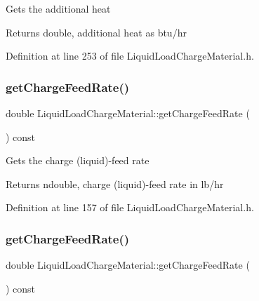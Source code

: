 Gets the additional heat \begin{DoxyReturn}{Returns}
double, additional heat as btu/hr 
\end{DoxyReturn}


Definition at line 253 of file Liquid\+Load\+Charge\+Material.\+h.

\mbox{\label{class_liquid_load_charge_material_af818c541527b3b28a8f84a08dc0c884e}} 
\subsubsection{\texorpdfstring{get\+Charge\+Feed\+Rate()}{getChargeFeedRate()}\hspace{0.1cm}{\footnotesize\ttfamily [1/3]}}
{\footnotesize\ttfamily double Liquid\+Load\+Charge\+Material\+::get\+Charge\+Feed\+Rate (\begin{DoxyParamCaption}{ }\end{DoxyParamCaption}) const\hspace{0.3cm}{\ttfamily [inline]}}

Gets the charge (liquid)-\/feed rate \begin{DoxyReturn}{Returns}
ndouble, charge (liquid)-\/feed rate in lb/hr 
\end{DoxyReturn}


Definition at line 157 of file Liquid\+Load\+Charge\+Material.\+h.

\mbox{\label{class_liquid_load_charge_material_af818c541527b3b28a8f84a08dc0c884e}} 
\subsubsection{\texorpdfstring{get\+Charge\+Feed\+Rate()}{getChargeFeedRate()}\hspace{0.1cm}{\footnotesize\ttfamily [2/3]}}
{\footnotesize\ttfamily double Liquid\+Load\+Charge\+Material\+::get\+Charge\+Feed\+Rate (\begin{DoxyParamCaption}{ }\end{DoxyParamCaption}) const\hspace{0.3cm}{\ttfamily [inline]}}

